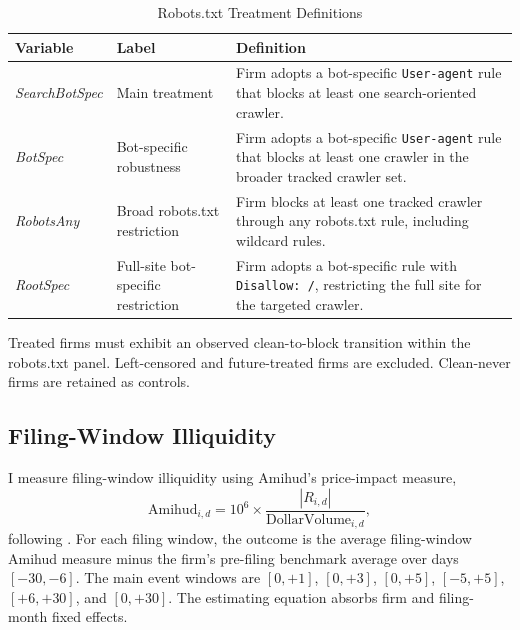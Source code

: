 \begin{table}[!htbp]
\centering
\caption{Robots.txt Treatment Definitions}
\label{tab:robots_treatment_definitions}
\begin{threeparttable}
\begin{tabular}{llp{7.5cm}}
\toprule
Variable & Label & Definition \\
\midrule
\textit{SearchBotSpec} & Main treatment &
Firm adopts a bot-specific \texttt{User-agent} rule that blocks at least
one search-oriented crawler. \\
\textit{BotSpec} & Bot-specific robustness &
Firm adopts a bot-specific \texttt{User-agent} rule that blocks at least
one crawler in the broader tracked crawler set. \\
\textit{RobotsAny} & Broad robots.txt restriction &
Firm blocks at least one tracked crawler through any robots.txt rule,
including wildcard rules. \\
\textit{RootSpec} & Full-site bot-specific restriction &
Firm adopts a bot-specific rule with \texttt{Disallow: /}, restricting
the full site for the targeted crawler. \\
\bottomrule
\end{tabular}
\begin{tablenotes}[flushleft]\footnotesize
\item Treated firms must exhibit an observed clean-to-block transition
within the robots.txt panel.  Left-censored and future-treated firms are
excluded.  Clean-never firms are retained as controls.
\end{tablenotes}
\end{threeparttable}
\end{table}

\subsection{Filing-Window Illiquidity}
\label{subsec:robots_amihud}

I measure filing-window illiquidity using Amihud's price-impact measure,
\[
    \text{Amihud}_{i,d}
    =
    10^6 \times \frac{|R_{i,d}|}{\text{DollarVolume}_{i,d}},
\]
following \citet{Amihud2002}.  For each filing window, the outcome is the
average filing-window Amihud measure minus the firm's pre-filing benchmark
average over days \([-30,-6]\).  The main event windows are \([0,+1]\),
\([0,+3]\), \([0,+5]\), \([-5,+5]\), \([+6,+30]\), and \([0,+30]\).  The
estimating equation absorbs firm and filing-month fixed effects.

